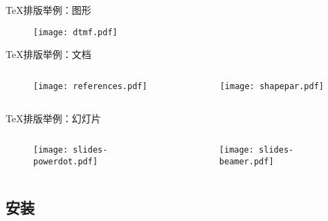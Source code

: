 \begin{frame}{\TeX{}排版举例：图形}
\begin{minipage}[t]{0.5\linewidth}
    \begin{figure}[h]
      \centering
      \texttt{[image: dtmf.pdf]}
    \end{figure}
  \end{minipage}
\end{frame}

\begin{frame}{\TeX{}排版举例：文档}
  \begin{columns}
    \begin{column}{.45\textwidth}
      \begin{figure}[h]
        \centering
        \texttt{[image: references.pdf]}
      \end{figure}
    \end{column}
    \begin{column}{.45\textwidth}
      \begin{figure}[h]
        \centering
        \texttt{[image: shapepar.pdf]}
      \end{figure}
    \end{column}
  \end{columns}
\end{frame}

\begin{frame}{\TeX{}排版举例：幻灯片}
  \begin{columns}
    \begin{column}{.45\textwidth}
      \begin{figure}[h]
        \centering
        \texttt{[image: slides-powerdot.pdf]}
      \end{figure}
    \end{column}
    \begin{column}{.45\textwidth}
      \begin{figure}[h]
        \centering
        \texttt{[image: slides-beamer.pdf]}
      \end{figure}
    \end{column}
  \end{columns}
\end{frame}

\subsection{安装}

